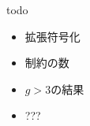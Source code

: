 \documentclass[dvipdfmx, 11pt]{beamer}
\begin{document}
\appendix
\begin{frame}{todo}
  \begin{itemize}
  \item 拡張符号化
  \item 制約の数
  \item $g > 3$の結果
  \item ???
  \end{itemize}
\end{frame}
\end{document}
